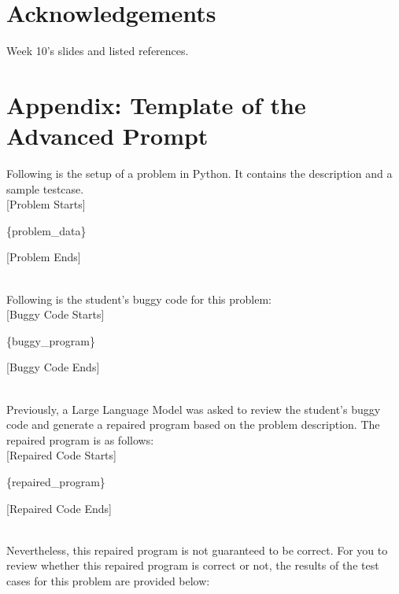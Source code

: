 \documentclass{article}
\begin{document}
\clearpage

\section*{Acknowledgements}
Week 10's slides and listed references.




\clearpage

\section{Appendix: Template of the Advanced Prompt}\label{appendix:advanced-prompt}

\begin{figure*}[h!]
    \centering
    \begin{tcolorbox}[colframe=black!10!white, colback=black!5!white]
        \begin{minipage}{\textwidth}
            \ttfamily
            Following is the setup of a problem in Python. It contains the description and a sample testcase.\\

            [Problem Starts]

            \{problem\_data\}

            [Problem Ends]

            \texttt{\\}
            Following is the student's buggy code for this problem:\\

            [Buggy Code Starts]

            \{buggy\_program\}

            [Buggy Code Ends]

            \texttt{\\}
            Previously, a Large Language Model was asked to review the student's buggy code and generate a repaired program based on the problem description. The repaired program is as follows:\\

            [Repaired Code Starts]

            \{repaired\_program\}

            [Repaired Code Ends]

            \texttt{\\}
            Nevertheless, this repaired program is not guaranteed to be correct. For you to review whether this repaired program is correct or not, the results of the test cases for this problem are provided below:\\


\end{minipage}
\end{tcolorbox}
\end{figure*}
\end{document}
